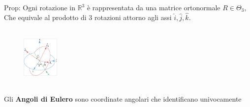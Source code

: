 \documentclass{article}
\theoremstyle{unnumbered}
\theoremstyle{unnumbered1}
\begin{document}
%
%
%
Prop: Ogni rotazione in $\mathbb{R}^3$ è rappresentata da una matrice ortonormale $R\in\Theta_3$, \\
\phantom{Prop: }Che equivale al prodotto di 3 rotazioni attorno agli assi $\hat{i}, \hat{j}, \hat{k}$. \ \ \ \ \ \ \ \ \ \ \ \ \ \ \ \ \ \ \ \ \ \ \ \ \ \ \ \ \ \ \ \ \ \ \ \ \ \ \ \ \ \ \ \ \ \ \ \ \ \ \ \
%
%
%
\begin{figure}
\includegraphics[width=0.16\textwidth]{Eulero.jpeg}
\end{figure}\\
%
%
Gli \textbf{Angoli di Eulero} sono coordinate angolari che identificano univocamente 
\end{document}
